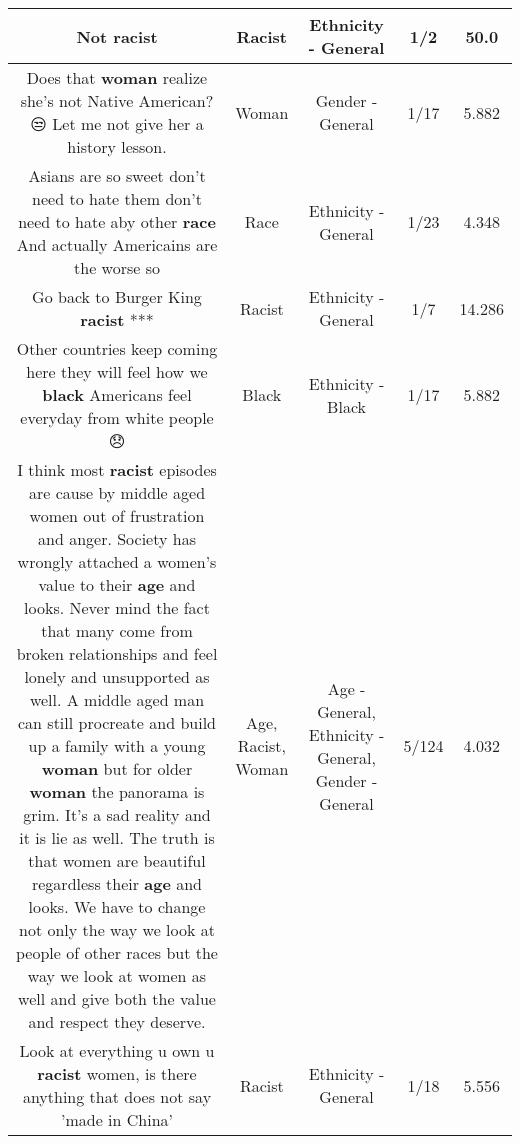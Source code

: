 \documentclass[11pt]{article}
\newlength\mylength
\begin{document}
\begin{center}
\begin{longtable}{|C{.65\mylength}|C{.30\mylength}|C{.12\mylength}|C{.12\mylength}|C{.12\mylength}|}
  \small Not racist\normalsize   & Racist & Ethnicity - General & 1/2 & 50.0 \\  \hline
  \small Does that \textbf{woman} realize she's not Native American?  😒 Let me not give her a history lesson.\normalsize   & Woman & Gender - General & 1/17 & 5.882 \\  \hline
  \small Asians are so sweet don't need to hate them don't need to hate aby other \textbf{race} And actually Americains are the worse so\normalsize   & Race & Ethnicity - General & 1/23 & 4.348 \\  \hline
  \small Go back to Burger King \textbf{racist} ***\normalsize   & Racist & Ethnicity - General & 1/7 & 14.286 \\  \hline
  \small Other countries keep coming here they will feel how we \textbf{black} Americans feel everyday from white people😞\normalsize   & Black & Ethnicity - Black & 1/17 & 5.882 \\  \hline
  \small I think most \textbf{racist} episodes are cause by middle aged women out of frustration and anger. Society has wrongly attached a women's value to their \textbf{age} and  looks.  Never mind the fact that many come from broken relationships and feel lonely and unsupported as well.  A middle aged man can still procreate and build up a family with a young \textbf{woman} but for older \textbf{woman} the panorama is grim. It's a sad reality and it is lie as well. The truth is that women are beautiful regardless their \textbf{age} and looks. We have to change not only the way we look at people of other races but the way we look at women as well and give both the value and respect they deserve.\normalsize   & Age, Racist, Woman & Age - General, Ethnicity - General, Gender - General & 5/124 & 4.032 \\  \hline
  \small Look at everything u own u \textbf{racist} women, is there anything that does not say 'made in China'\normalsize   & Racist & Ethnicity - General & 1/18 & 5.556 \\  \hline

\end{longtable}
\end{center}
\end{document}
